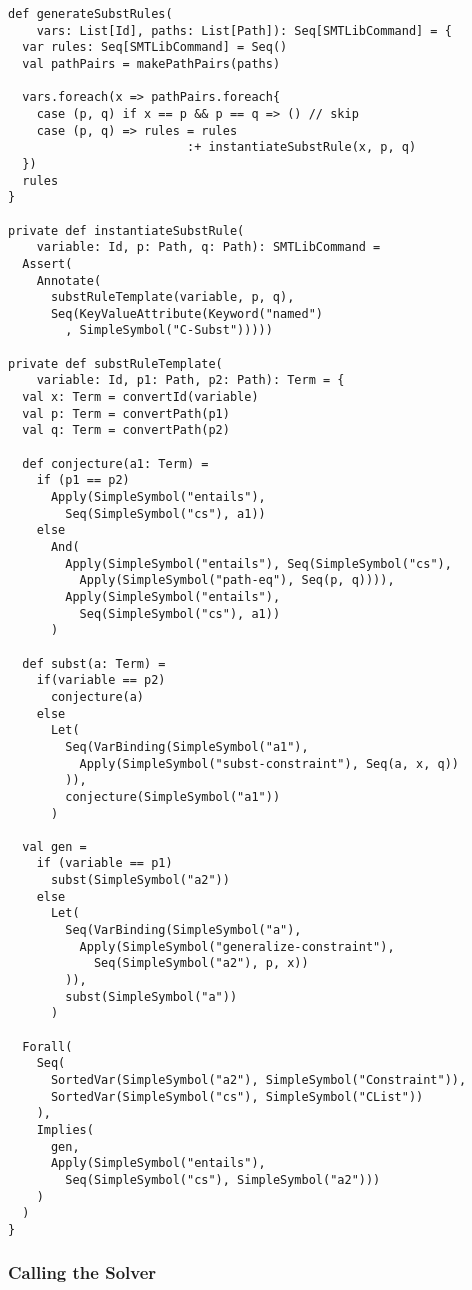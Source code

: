 \begin{lstlisting}[caption={Rule Generation for C-Subst},label=lst:subst,captionpos=b,frame={lines}]
def generateSubstRules(
    vars: List[Id], paths: List[Path]): Seq[SMTLibCommand] = {
  var rules: Seq[SMTLibCommand] = Seq()
  val pathPairs = makePathPairs(paths)

  vars.foreach(x => pathPairs.foreach{
    case (p, q) if x == p && p == q => () // skip
    case (p, q) => rules = rules
                         :+ instantiateSubstRule(x, p, q)
  })
  rules
}

private def instantiateSubstRule(
    variable: Id, p: Path, q: Path): SMTLibCommand =
  Assert(
    Annotate(
      substRuleTemplate(variable, p, q),
      Seq(KeyValueAttribute(Keyword("named")
        , SimpleSymbol("C-Subst")))))

private def substRuleTemplate(
    variable: Id, p1: Path, p2: Path): Term = {
  val x: Term = convertId(variable)
  val p: Term = convertPath(p1)
  val q: Term = convertPath(p2)

  def conjecture(a1: Term) =
    if (p1 == p2)
      Apply(SimpleSymbol("entails"),
        Seq(SimpleSymbol("cs"), a1))
    else
      And(
        Apply(SimpleSymbol("entails"), Seq(SimpleSymbol("cs"),
          Apply(SimpleSymbol("path-eq"), Seq(p, q)))),
        Apply(SimpleSymbol("entails"),
          Seq(SimpleSymbol("cs"), a1))
      )

  def subst(a: Term) =
    if(variable == p2)
      conjecture(a)
    else
      Let(
        Seq(VarBinding(SimpleSymbol("a1"),
          Apply(SimpleSymbol("subst-constraint"), Seq(a, x, q))
        )),
        conjecture(SimpleSymbol("a1"))
      )

  val gen =
    if (variable == p1)
      subst(SimpleSymbol("a2"))
    else
      Let(
        Seq(VarBinding(SimpleSymbol("a"),
          Apply(SimpleSymbol("generalize-constraint"),
            Seq(SimpleSymbol("a2"), p, x))
        )),
        subst(SimpleSymbol("a"))
      )

  Forall(
    Seq(
      SortedVar(SimpleSymbol("a2"), SimpleSymbol("Constraint")),
      SortedVar(SimpleSymbol("cs"), SimpleSymbol("CList"))
    ),
    Implies(
      gen,
      Apply(SimpleSymbol("entails"),
        Seq(SimpleSymbol("cs"), SimpleSymbol("a2")))
    )
  )
}
\end{lstlisting}
%

\subsubsection{Calling the Solver}


